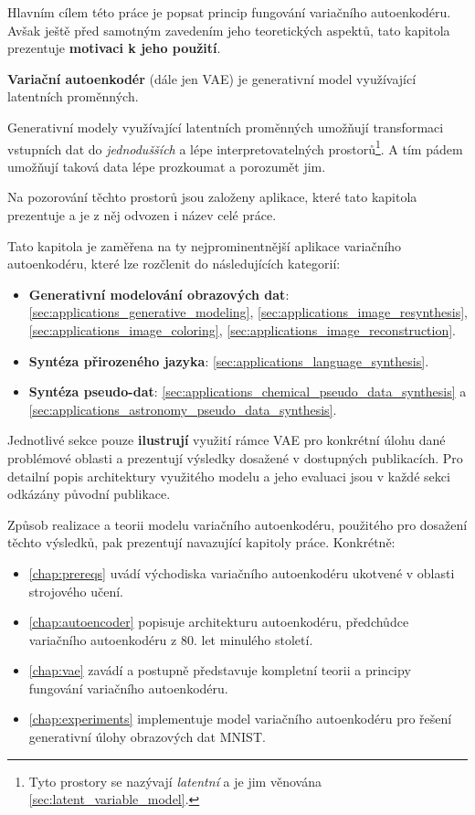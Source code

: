 Hlavním cílem této práce je popsat princip fungování variačního autoenkodéru.
Avšak ještě před samotným zavedením jeho teoretických aspektů, tato kapitola prezentuje \textbf{motivaci k jeho použití}.


\textbf{Variační autoenkodér} (dále jen VAE) je generativní model využívající latentních proměnných.

Generativní modely využívající latentních proměnných umožňují transformaci vstupních dat
do \emph{jednodušších} a lépe interpretovatelných prostorů\footnote{Tyto prostory se nazývají \emph{latentní} a je jim věnována \autoref{sec:latent_variable_model}.}.
A tím pádem umožňují taková data lépe prozkoumat a porozumět jim. \cite{Kingma2019}

Na pozorování těchto prostorů jsou založeny aplikace, které tato kapitola prezentuje a je z něj odvozen i název celé práce.

Tato kapitola je zaměřena na ty nejprominentnější aplikace variačního autoenkodéru, které lze rozčlenit do následujících kategorií:

\begin{itemize}
    \item \textbf{Generativní modelování obrazových dat}: \autoref{sec:applications_generative_modeling}, \autoref{sec:applications_image_resynthesis}, \autoref{sec:applications_image_coloring}, \autoref{sec:applications_image_reconstruction}.
    \item \textbf{Syntéza přirozeného jazyka}: \autoref{sec:applications_language_synthesis}. 
    \item \textbf{Syntéza pseudo-dat}: \autoref{sec:applications_chemical_pseudo_data_synthesis} a \autoref{sec:applications_astronomy_pseudo_data_synthesis}.
\end{itemize}

Jednotlivé sekce pouze \textbf{ilustrují} využití rámce VAE pro konkrétní úlohu dané problémové oblasti a prezentují výsledky dosažené v dostupných publikacích.
Pro detailní popis architektury využitého modelu a jeho evaluaci jsou v každé sekci odkázány původní publikace.

Způsob realizace a teorii modelu variačního autoenkodéru, použitého pro dosažení těchto výsledků, pak prezentují navazující kapitoly práce.
Konkrétně:
\begin{itemize}
    \item \autoref{chap:prereqs} uvádí východiska variačního autoenkodéru ukotvené v oblasti strojového učení.
    \item \autoref{chap:autoencoder} popisuje architekturu autoenkodéru, předchůdce variačního autoenkodéru z 80. let minulého století.
    \item \autoref{chap:vae} zavádí a postupně představuje kompletní teorii a principy fungování variačního autoenkodéru.
    \item \autoref{chap:experiments} implementuje model variačního autoenkodéru pro řešení generativní úlohy obrazových dat MNIST.
\end{itemize}